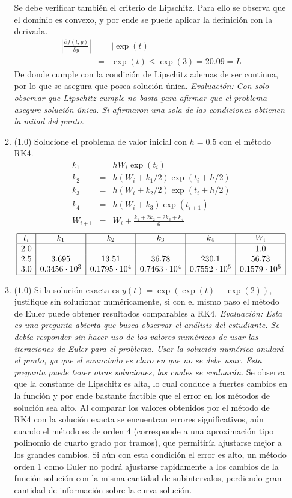 \documentclass[12pt]{article}
\newcommand{\pdiff}[3]{\frac{\partial^{#3} #1}{\partial#2^{#3}}}
\newcommand{\abs}[1]{\left| #1 \right|}
\begin{document}
\begin{enumerate}[leftmargin=*,widest=9]
\begin{enumerate}[label=\alph*]
    Se debe verificar también el criterio de Lipschitz. Para ello se observa que el dominio es convexo, y por ende se puede aplicar la definición con la derivada.
    \begin{eqnarray*}
    \abs{\pdiff{f(t,y)}{y}{}} & = & \abs{\exp(t)} \\
    & = & \exp(t) \leq \exp(3) = 20.09 = L
    \end{eqnarray*}
    De donde cumple con la condición de Lipschitz ademas de ser continua, por lo que se asegura que posea solución única.
    \textit{Evaluación: Con solo observar que Lipschitz cumple no basta para afirmar que el problema asegure solución única. Si afirmaron una sola de las condiciones obtienen la mitad del punto.}
    \item (\(1.0\)) Solucione el problema de valor inicial con \(h=0.5\) con el método RK4.
   \begin{eqnarray*}
   k_1 & = & h W_i \exp(t_i) \\
   k_2 & = & h (W_i + k_1/2) \exp(t_i + h/2)\\
   k_3 & = & h (W_i + k_2/2) \exp(t_i + h/2)\\
   k_4 & = & h (W_i + k_3) \exp(t_{i+1})\\
   W_{i+1} & = & W_i + \frac{k_1+2k_2+2k_3+k_4}{6}
   \end{eqnarray*}
   \[
   \begin{array}{|c|c|c|c|c|c|}
   \hline
   t_i & k_1 & k_2 & k_3 & k_4 & W_i\\
   \hline
   2.0 & &&&& 1.0 \\
   2.5 & 3.695 & 13.51 & 36.78 & 230.1 & 56.73\\
   3.0 & 0.3456 \cdot 10^3 & 0.1795 \cdot 10^4 & 0.7463 \cdot 10^4 & 0.7552 \cdot 10^5 & 0.1579 \cdot 10^5 \\
   \hline
   \end{array}
   \]
   \item (\(1.0\)) Si la solución exacta es \( y(t) = \exp(\exp(t)-\exp(2))\), justifique sin solucionar numéricamente, si con el mismo paso el método de Euler puede obtener resultados comparables a RK4.
   \textit{Evaluación: Esta es una pregunta abierta que busca observar el análisis del estudiante. Se debía responder sin hacer uso de los valores numéricos de usar las iteraciones de Euler para el problema. Usar la solución numérica anulará el punto, ya que el enunciado es claro en que no se debe usar. Esta pregunta puede tener otras soluciones, las cuales se evaluarán.}
   Se observa que la constante de Lipschitz es alta, lo cual conduce a fuertes cambios en la función y por ende bastante factible que el error en los métodos de solución sea alto. Al comparar los valores obtenidos por el método de RK4 con la solución exacta se encuentran errores significativos, aún cuando el método es de orden 4 (corresponde a una aproximación tipo polinomio de cuarto grado por tramos), que permitiría ajustarse mejor a los grandes cambios. Si aún con esta condición el error es alto, un método orden 1 como Euler no podrá ajustarse rapidamente a los cambios de la función solución con la misma cantidad de subintervalos, perdiendo gran cantidad de información sobre la curva solución.

\end{enumerate}
\end{enumerate}
\end{document}
